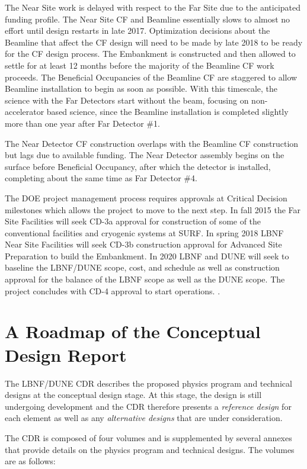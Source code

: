 The Near Site work is delayed with respect to the Far Site due to the anticipated funding profile. The Near Site CF and Beamline essentially slows to almost no effort until design restarts in late 2017. Optimization decisions about the Beamline that affect the CF design will need to be made by late 2018 to be ready for the CF design process. The Embankment is constructed and then allowed to settle for at least 12 months before the majority of the Beamline CF work proceeds. The Beneficial Occupancies of the Beamline CF are staggered to allow Beamline installation to begin as soon as possible. With this timescale, the science with the Far Detectors start without the beam, focusing on non-accelerator based science, since
the Beamline installation is completed slightly more than one year after Far Detector \#1. 

The Near Detector CF construction overlaps with the Beamline CF construction but lags due to available funding. The Near Detector assembly begins on the surface before Beneficial Occupancy, after which the detector is installed, completing about the same time as Far Detector \#4. 

The DOE project management process requires approvals at Critical Decision milestones which allows the project to move to the next step. In fall 2015 the Far Site Facilities will seek CD-3a approval for construction of some of the conventional facilities and cryogenic systems at SURF. In spring 2018 LBNF Near Site Facilities will seek CD-3b construction approval for Advanced Site Preparation to build the Embankment. In 2020 LBNF and DUNE will seek to baseline the LBNF/DUNE scope, cost, and schedule as well as construction approval for the balance of the LBNF scope as well as the DUNE scope. The project concludes with CD-4 approval to start operations.
. 


\section{A Roadmap of the Conceptual Design Report}

The LBNF/DUNE CDR describes the proposed physics program and 
technical designs at the conceptual design stage.  At this stage, the design is
still undergoing development and the CDR therefore presents a \textit{reference design} for each element as well as any 
\textit{alternative designs} that are under consideration.

The CDR is composed of four volumes and is supplemented
by several annexes that provide details on the physics program and technical designs. The volumes are as follows:

